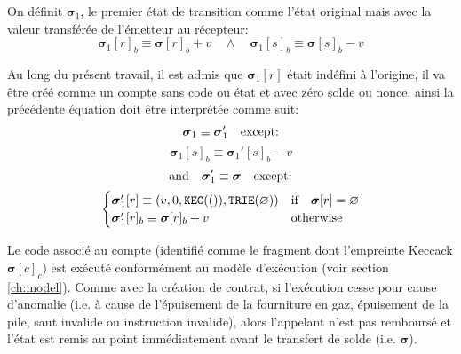 \documentclass[9pt,oneside]{amsart}
\begin{document}
\begin{multicols}{2}
On définit $\boldsymbol{\sigma}_1$, le premier état de transition comme l'état original mais avec la valeur transférée de l'émetteur au récepteur:
\begin{equation}
\boldsymbol{\sigma}_1[r]_b \equiv \boldsymbol{\sigma}[r]_b + v \quad\wedge\quad \boldsymbol{\sigma}_1[s]_b \equiv \boldsymbol{\sigma}[s]_b - v
\end{equation}

Au long du présent travail, il est admis que $\boldsymbol{\sigma}_1[r]$ était indéfini à l'origine, il va être créé comme un compte sans code ou état et avec zéro solde ou nonce. ainsi la précédente équation doit être interprétée comme suit:
\begin{equation}
\boldsymbol{\sigma}_1 \equiv \boldsymbol{\sigma}_1' \quad \text{except:} \\
\end{equation}
\begin{equation}
\boldsymbol{\sigma}_1[s]_b \equiv \boldsymbol{\sigma}_1'[s]_b - v
\end{equation}
\begin{equation}
\text{and}\quad \boldsymbol{\sigma}_1' \equiv \boldsymbol{\sigma} \quad \text{except:} \\
\end{equation}
\begin{equation}
\begin{cases}
\boldsymbol{\sigma}_1'[r] \equiv (v, 0, \mathtt{\tiny KEC}(()), \mathtt{\tiny TRIE}(\varnothing)) & \text{if} \quad \boldsymbol{\sigma}[r] = \varnothing \\
\boldsymbol{\sigma}_1'[r]_b \equiv \boldsymbol{\sigma}[r]_b + v & \text{otherwise}
\end{cases}
\end{equation}

Le code associé au compte (identifié comme le fragment dont l'empreinte Keccack $\boldsymbol{\sigma}[c]_c$) est exécuté conformément au modèle d'exécution (voir section \ref{ch:model}). Comme avec la création de contrat, si l'exécution cesse pour cause d'anomalie (i.e. à cause de l'épuisement de la fourniture en gaz, épuisement de la pile, saut invalide ou instruction invalide), alors l'appelant n'est pas remboursé et l'état est remis au point immédiatement avant le transfert de solde (i.e. $\boldsymbol{\sigma}$).


\end{multicols}
\end{document}

